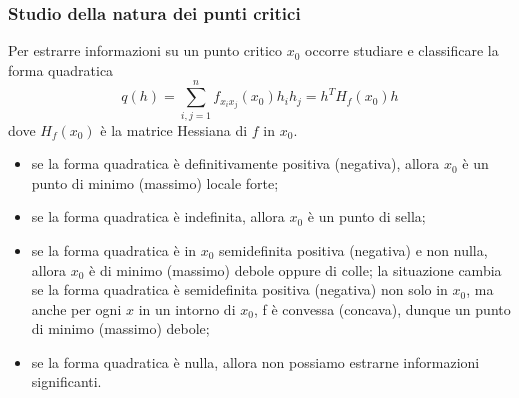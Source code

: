 \subsubsection*{Studio della natura dei punti critici}
Per estrarre informazioni su un punto critico $x_0$ occorre studiare e classificare la forma quadratica 
\[
    q(h) = \sum_{i,j=1}^{n}f_{x_ix_j}(x_0)h_ih_j = h^TH_f(x_0)h
\]
dove $H_f(x_0)$ è la matrice Hessiana di $f$ in $x_0$.\newline
\begin{tcolorbox}
\begin{itemize}
    \item se la forma quadratica è definitivamente positiva (negativa), allora $x_0$ è un punto di minimo (massimo) locale forte;
    \item se la forma quadratica è indefinita, allora $x_0$ è un punto di sella;
    \item se la forma quadratica è in $x_0$ semidefinita positiva (negativa) e non nulla, allora $x_0$ è di minimo (massimo) debole oppure di colle; la situazione cambia se la forma quadratica è semidefinita positiva (negativa) non solo in $x_0$, ma anche per ogni $x$ in un intorno di $x_0$, f è convessa (concava), dunque un punto di minimo (massimo) debole;
    \item se la forma quadratica è nulla, allora non possiamo estrarne informazioni significanti.
\end{itemize}
\end{tcolorbox}
